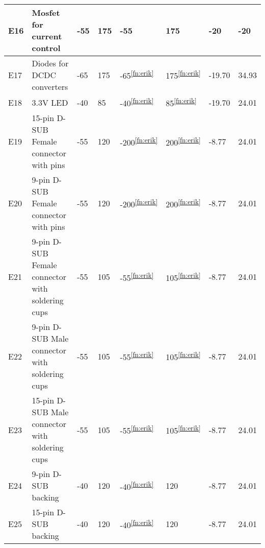\begin{longtable}{|m{1cm}|m{3.5cm}|m{1.3cm}|m{1.3cm}|m{1.4cm}|m{1.3cm}|m{1.3cm}|m{1.3cm}|}
E16 & Mosfet for current control & -55 & 175 & -55 & 175 & -20 & -20 \\ \hline
E17 & Diodes for DCDC converters & -65 & 175 & -65\textsuperscript{\ref{fn:erik}} & 175\textsuperscript{\ref{fn:erik}} & -19.70 & 34.93 \\ \hline
E18 & 3.3V LED & -40 & 85 & -40\textsuperscript{\ref{fn:erik}} & 85\textsuperscript{\ref{fn:erik}} & -19.70 & 24.01 \\ \hline 
E19 & 15-pin D-SUB Female connector with pins & -55 & 120 & -200\textsuperscript{\ref{fn:erik}} & 200\textsuperscript{\ref{fn:erik}} & -8.77 & 24.01 \\ \hline
E20 & 9-pin D-SUB Female connector with pins & -55 & 120  & -200\textsuperscript{\ref{fn:erik}} & 200\textsuperscript{\ref{fn:erik}} & -8.77 & 24.01 \\ \hline
E21 & 9-pin D-SUB Female connector with soldering cups & -55 & 105 & -55\textsuperscript{\ref{fn:erik}} & 105\textsuperscript{\ref{fn:erik}} & -8.77 & 24.01 \\ \hline
E22 & 9-pin D-SUB Male connector with soldering cups & -55 & 105 & -55\textsuperscript{\ref{fn:erik}} & 105\textsuperscript{\ref{fn:erik}} & -8.77 & 24.01 \\ \hline
E23 & 15-pin D-SUB Male connector with soldering cups & -55  & 105 & -55\textsuperscript{\ref{fn:erik}} & 105\textsuperscript{\ref{fn:erik}} & -8.77 & 24.01 \\ \hline
E24 & 9-pin D-SUB backing & -40 & 120 & -40\textsuperscript{\ref{fn:erik}} & 120 & -8.77 & 24.01  \\ \hline
E25 & 15-pin D-SUB backing & -40 & 120 & -40\textsuperscript{\ref{fn:erik}} & 120 & -8.77 & 24.01  \\ \hline

\end{longtable}
